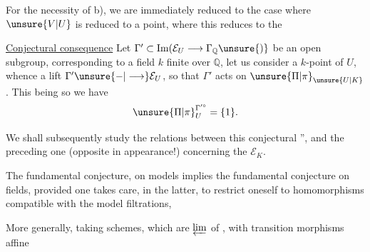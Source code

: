For the necessity of b), we are immediately reduced to the case where $\unsure{V|U}$ is reduced to a point, where this reduces to the 

\uline{Conjectural consequence} Let $\Gamma'\subset\operatorname{Im}(\mathcal E_U\longrightarrow\Gamma_{\mathbb{Q}}\unsure{)}$ be an open subgroup, corresponding to a field $k$ finite over $\mathbb{Q}$, let us consider a $k$-point of $U$, whence a lift $\Gamma'\unsure{-|\longrightarrow}\mathcal E_U$, so that $\Gamma'$ acts on $\unsure{\Pi|\pi}_{\unsure{U|K}}$. This being so\unsure{,} we have
\[
\unsure{\Pi|\pi}_U^{\Gamma'^\circ}=\{1\}.
\]

We shall subsequently study the relations between this conjectural '', and the preceding one (opposite in appearance!) concerning the $\mathcal E_K$.

The fundamental conjecture, on models implies the fundamental conjecture on fields, provided one takes care, in the latter, to restrict oneself to homomorphisms compatible with the model filtrations,

More generally, taking  schemes,  which are $\varprojlim$ of   , with transition morphisms affine 
